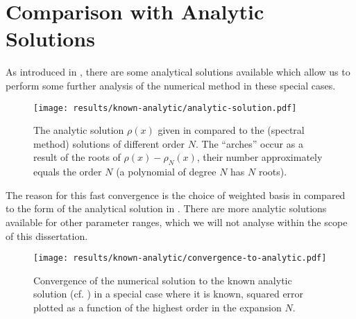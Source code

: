 \section{Comparison with Analytic Solutions}
As introduced in , there are some analytical solutions available which allow us to perform some further analysis of the numerical method in these special cases.

\begin{figure}[H]
  \centering
  \texttt{[image: results/known-analytic/analytic-solution.pdf]}
  \caption[Comparison with analytical solutions and error]{
    The analytic solution $\rho(x)$ given in  compared to the (spectral method) solutions of different order $N$.
    The ``arches'' occur as a result of the roots of $\rho(x) - \rho_N(x)$, their number approximately equals the order $N$ (a polynomial of degree $N$ has $N$ roots).
  }
  \label{fig:analytic-solution}
\end{figure}

The reason for this fast convergence is the choice of weighted basis in  compared to the form of the analytical solution in .
There are more analytic solutions available for other parameter ranges, which we will not analyse within the scope of this dissertation.



\begin{figure}[H]
  \centering
  \texttt{[image: results/known-analytic/convergence-to-analytic.pdf]}
  \caption[Convergence to analytic solution]{Convergence of the numerical solution to the known analytic solution (cf. ) in a special case where it is known, squared error plotted as a function of the highest order in the expansion $N$.}
  \label{fig:convergence-to-analytic}
\end{figure}
